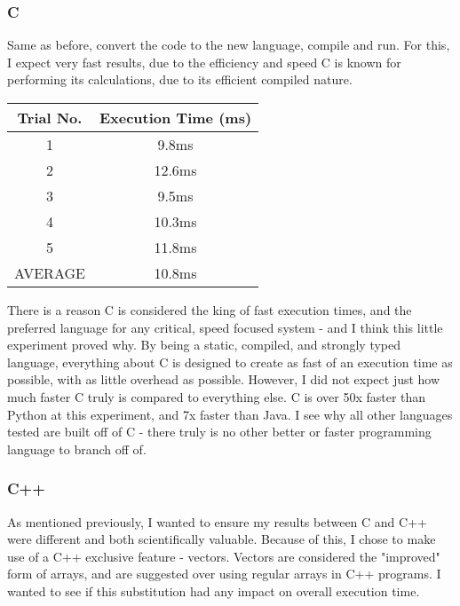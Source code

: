 \documentclass{article}
\begin{document}
    \subsubsection{C}
    
    \medskip\noindent Same as before, convert the code to the new language, compile and run. For this, I expect very fast results, due to the efficiency and speed C is known for performing its calculations, due to its efficient compiled nature.
    
                \begin{center}
    \begin{tabular}{||c c|} 
    \hline
   Trial No. & Execution Time (ms)\\ [0.5ex] 
    \hline\hline
    1 & 9.8ms \\ 
     \hline
    2 & 12.6ms \\
     \hline
    3 & 9.5ms\\
    \hline
    4 & 10.3ms\\ 
     \hline
    5 & 11.8ms\\
    \hline\hline
    AVERAGE & 10.8ms\\
    \hline
    \end{tabular}
    \end{center}
    
    \medskip\noindent There is a reason C is considered the king of fast execution times, and the preferred language for any critical, speed focused system - and I think this little experiment proved why. By being a static, compiled, and strongly typed language, everything about C is designed to create as fast of an execution time as possible, with as little overhead as possible. However, I did not expect just how much faster C truly is compared to everything else. C is over 50x faster than Python at this experiment, and 7x faster than Java. I see why all other languages tested are built off of C - there truly is no other better or faster programming language to branch off of. 
    
    \subsubsection{C++}
    
    \medskip\noindent As mentioned previously, I wanted to ensure my results between C and C++ were different and both scientifically valuable. Because of this, I chose to make use of a C++ exclusive feature - vectors. Vectors are considered the "improved" form of arrays, and are suggested over using regular arrays in C++ programs. I wanted to see if this substitution had any impact on overall execution time. 
    
\end{document}

